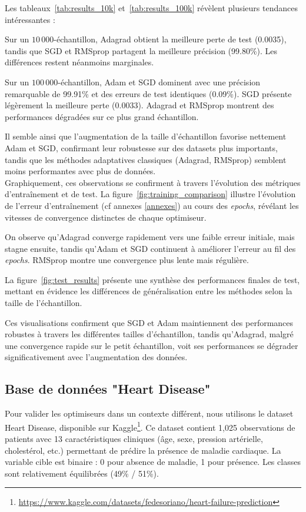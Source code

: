 \documentclass[a4paper,12pt]{article}
\begin{document}
\par Les tableaux~\ref{tab:results_10k} et~\ref{tab:results_100k} révèlent plusieurs tendances intéressantes : \\
\par Sur un $10\,000$-échantillon, Adagrad obtient la meilleure perte de test (0.0035), tandis que SGD et RMSprop partagent la meilleure précision (99.80\%). Les différences restent néanmoins marginales. \\
\par Sur un $100\,000$-échantillon, Adam et SGD dominent avec une précision remarquable de 99.91\% et des erreurs de test identiques (0.09\%). SGD présente légèrement la meilleure perte (0.0033). Adagrad et RMSprop montrent des performances dégradées sur ce plus grand échantillon.\\
\par Il semble ainsi que l'augmentation de la taille d'échantillon favorise nettement Adam et SGD, confirmant leur robustesse sur des datasets plus importants, tandis que les méthodes adaptatives classiques (Adagrad, RMSprop) semblent moins performantes avec plus de données.\\

Graphiquement, ces observations se confirment à travers l'évolution des métriques d'entraînement et de test. La figure~\ref{fig:training_comparison} illustre l'évolution de l'erreur d'entraînement (cf annexes \ref{annexes}) au cours des \textit{epochs}, révélant les vitesses de convergence distinctes de chaque optimiseur.\\
\par On observe qu'Adagrad converge rapidement vers une faible erreur initiale, mais stagne ensuite, tandis qu'Adam et SGD continuent à améliorer l'erreur au fil des \textit{epochs}. RMSprop montre une convergence plus lente mais régulière.

La figure~\ref{fig:test_results} présente une synthèse des performances finales de test, mettant en évidence les différences de généralisation entre les méthodes selon la taille de l'échantillon.\\
\par Ces visualisations confirment que SGD et Adam maintiennent des performances robustes à travers les différentes tailles d'échantillon, tandis qu'Adagrad, malgré une convergence rapide sur le petit échantillon, voit ses performances se dégrader significativement avec l'augmentation des données.

\subsection{Base de données "Heart Disease"}
Pour valider les optimiseurs dans un contexte différent, nous utilisons le dataset Heart Disease, disponible sur Kaggle\footnote{\url{https://www.kaggle.com/datasets/fedesoriano/heart-failure-prediction}}. Ce dataset contient 1,025 observations de patients avec 13 caractéristiques cliniques (âge, sexe, pression artérielle, cholestérol, etc.) permettant de prédire la présence de maladie cardiaque. La variable cible est binaire : 0 pour absence de maladie, 1 pour présence. Les classes sont relativement équilibrées (49\% / 51\%).
\end{document}
